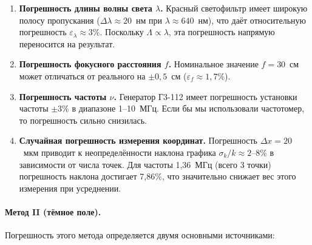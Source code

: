 \documentclass[a4paper]{article}
\begin{document}
\begin{enumerate}
    \item \textbf{Погрешность длины волны света $\lambda$.} Красный светофильтр имеет широкую полосу пропускания ($\Delta\lambda \approx 20$~нм при $\lambda \approx 640$~нм), что даёт относительную погрешность $\varepsilon_\lambda \approx 3\%$. Поскольку $\Lambda \propto \lambda$, эта погрешность напрямую переносится на результат.
    
    \item \textbf{Погрешность фокусного расстояния $f$.} Номинальное значение $f = 30$~см может отличаться от реального на $\pm 0{,}5$~см ($\varepsilon_f \approx 1{,}7\%$).
    
    \item \textbf{Погрешность частоты $\nu$.} Генератор Г3-112 имеет погрешность установки частоты $\pm 3\%$ в диапазоне 1--10~МГц. Если бы мы использовали частотомер, то погрешность сильно снизилась.
    
    \item \textbf{Случайная погрешность измерения координат.} Погрешность $\Delta x = 20$~мкм приводит к неопределённости наклона графика $\sigma_k/k \approx 2$--8\% в зависимости от числа точек. Для частоты 1,36~МГц (всего 3 точки) погрешность наклона достигает 7,86\%, что значительно снижает вес этого измерения при усреднении.
\end{enumerate}

\paragraph{Метод II (тёмное поле).} 
Погрешность этого метода определяется двумя основными источниками:
\end{document}
